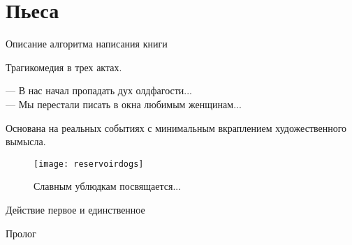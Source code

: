 \section*{Пьеса}
\begin{center}
    { \Large Описание алгоритма написания книги }

    Трагикомедия в трех актах.
\end{center}

\begin{epigraph}
    --- В нас начал пропадать дух олдфагости...\\
    --- Мы перестали писать в окна любимым женщинам...
\end{epigraph}

Основана на реальных событиях с минимальным вкраплением художественного вымысла.\\

\begin{figure}[ht!]
    \centering
    \texttt{[image: reservoirdogs]}
    \caption{Славным ублюдкам посвящается...}
\end{figure}

\begin{center}
    \Large Действие первое и единственное %
\end{center}

\begin{center}
    \large Пролог
\end{center}




